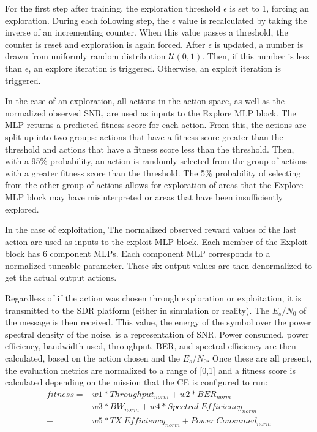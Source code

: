 \par For the first step after training, the exploration threshold $\epsilon$ is set to 1, forcing an exploration. During each following step, the $\epsilon$ value is recalculated by taking the inverse of an incrementing counter. When this value passes a threshold, the counter is reset and exploration is again forced. After $\epsilon$ is updated, a number is drawn from uniformly random distribution $\mathcal{U}(0,1)$. Then, if this number is less than $\epsilon$, an explore iteration is triggered. Otherwise, an exploit iteration is triggered.
\par In the case of an exploration, all actions in the action space, as well as the normalized observed SNR, are used as inputs to the Explore MLP block. The MLP returns a predicted fitness score for each action. From this, the actions are split up into two groups: actions that have a fitness score greater than the threshold and actions that have a fitness score less than the threshold. Then, with a 95\% probability, an action is randomly selected from the group of actions with a greater fitness score than the threshold. The 5\% probability of selecting from the other group of actions allows for exploration of areas that the Explore MLP block may have misinterpreted or areas that have been insufficiently explored.
\par In the case of exploitation, The normalized observed reward values of the last action are used as inputs to the exploit MLP block. Each member of the Exploit block has 6 component MLPs. Each component MLP corresponds to a normalized tuneable parameter. These six output values are then denormalized to get the actual output actions.
\par Regardless of if the action was chosen through exploration or exploitation, it is transmitted to the SDR platform (either in simulation or reality). The $E_s/N_0$ of the message is then received. This value, the energy of the symbol over the power spectral density of the noise, is a representation of SNR. Power consumed, power efficiency, bandwidth used, throughput, BER, and spectral efficiency are then calculated, based on the action chosen and the $E_s/N_0$. Once these are all present, the evaluation metrics are normalized to a range of [0,1] and a fitness score is calculated depending on the mission that the CE is configured to run:
\begin{align*}
	fitness =& w1*Throughput_{norm} + w2*BER_{norm}\\
	+& w3*BW_{norm} + w4*Spectral\ Efficiency_{norm} \\
	+& w5 * TX\ Efficiency_{norm} + Power\ Consumed_{norm} \label{bg:fitnessCalc}
\end{align*}  

